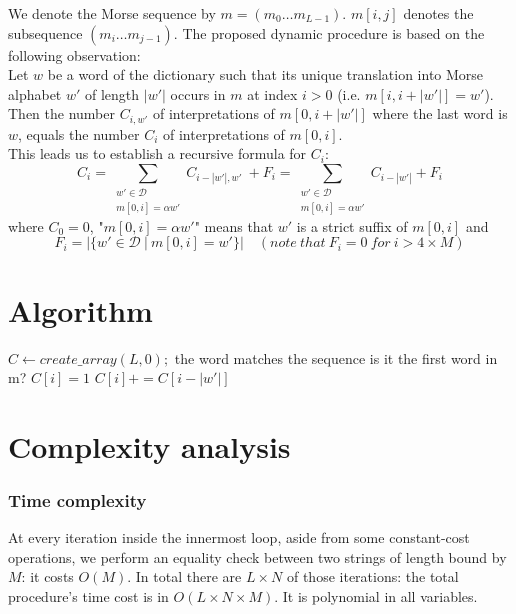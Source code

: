 \documentclass{article}
\begin{document}
We denote the Morse sequence by $m=(m_0\dots m_{L-1})$. $m[i,j]$ denotes the subsequence $(m_i\dots m_{j-1})$. The proposed dynamic procedure is based on the following observation:\\
Let $w$ be a word of the dictionary such that its unique translation into Morse alphabet $w'$ of length $|w'|$ occurs in $m$ at index $i>0$ (i.e. $m[i,i+|w'|]=w'$). Then the number $C_{i,w'}$ of interpretations of $m[0,i+|w'|]$ where the last word is $w$, equals the number $C_i$ of interpretations of $m[0,i]$.\\
This leads us to establish a recursive formula for $C_i$:
\begin{equation*}
    C_i = \sum_{\substack{w'\in\mathcal{D}\\ m[0,i]=\alpha w'}}{C_{i-|w'|, w'}}\ + F_i = \sum_{\substack{w'\in\mathcal{D}\\ m[0,i]=\alpha w'}}{C_{i-|w'|}}  + F_i
\end{equation*}
where $C_0 = 0$, "$ m[0,i]=\alpha w'$" means that $w'$ is a strict suffix of $m[0,i]$ and
\begin{equation*}
    F_i = |\{w'\in \mathcal{D}\ |\ m[0,i]=w'\}|\quad (note\ that\ F_i = 0\ for\ i>4\times M)
\end{equation*}

\section{Algorithm}

\begin{algorithm}
\begin{algorithmic}
\State $C \leftarrow create\_array(L, 0);$
         \Comment the word matches the sequence
             \Comment is it the first word in m?
                \State $C[i] = 1$
            \Else
                \State $C[i] += C[i-|w'|]$
            \EndIf
        \EndIf
        
    \EndFor
\EndFor
\State {}
\EndProcedure
\end{algorithmic}
\end{algorithm}

\section{Complexity analysis}
\subsubsection*{Time complexity}
At every iteration inside the innermost loop, aside from some constant-cost operations, we perform an equality check between two strings of length bound by $M$: it costs $O(M)$. In total there are $L\times N$ of those iterations: the total procedure's time cost is in $O(L\times N \times M)$. It is polynomial in all variables.
\end{document}
